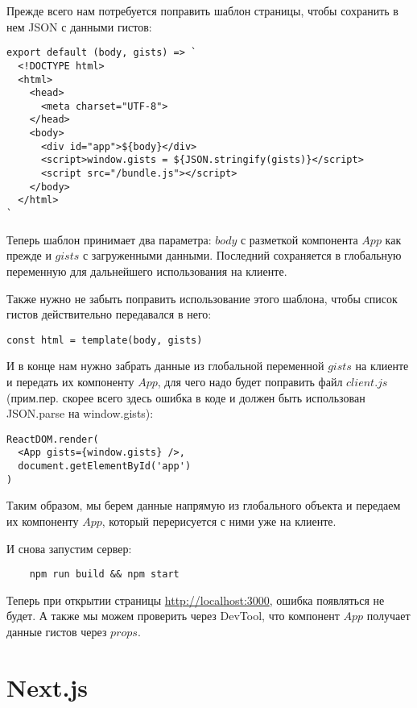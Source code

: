 Прежде всего нам потребуется поправить шаблон страницы, чтобы сохранить в нем JSON с данными гистов:

\begin{lstlisting}
export default (body, gists) => `
  <!DOCTYPE html>
  <html>
    <head>
      <meta charset="UTF-8">
    </head>
    <body>
      <div id="app">${body}</div>
      <script>window.gists = ${JSON.stringify(gists)}</script>
      <script src="/bundle.js"></script>
    </body>
  </html>
`
\end{lstlisting}

Теперь шаблон принимает два параметра: $body$ с разметкой компонента $App$ как прежде и $gists$ с загруженными данными. Последний сохраняется в глобальную переменную для дальнейшего использования на клиенте.

Также нужно не забыть поправить использование этого шаблона, чтобы список гистов действительно передавался в него:

\begin{lstlisting}
const html = template(body, gists)
\end{lstlisting}

И в конце нам нужно забрать данные из глобальной переменной $gists$ на клиенте и передать их компоненту $App$, для чего надо будет поправить файл $client.js$ (прим.пер. скорее всего здесь ошибка в коде и должен быть использован JSON.parse на window.gists):

\begin{lstlisting}
ReactDOM.render(
  <App gists={window.gists} />,
  document.getElementById('app')
)
\end{lstlisting}

Таким образом, мы берем данные напрямую из глобального объекта и передаем их компоненту $App$, который перерисуется с ними уже на клиенте.

И снова запустим сервер:

\begin{lstlisting}
	npm run build && npm start
\end{lstlisting}

Теперь при открытии страницы \href{http://localhost:3000}{http://localhost:3000}, ошибка появляться не будет. А также мы можем проверить через DevTool, что компонент $App$ получает данные гистов через $props$.

\section{Next.js}

